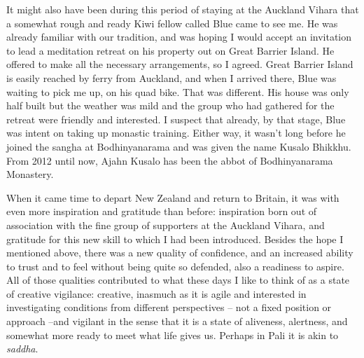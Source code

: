 It might also have been during this period of staying at the Auckland
Vihara that a somewhat rough and ready Kiwi fellow called Blue came to
see me. He was already familiar with our tradition, and was hoping I
would accept an invitation to lead a meditation retreat on his property
out on Great Barrier Island. He offered to make all the necessary
arrangements, so I agreed. Great Barrier Island is easily reached by
ferry from Auckland, and when I arrived there, Blue was waiting to pick
me up, on his quad bike. That was different. His house was only half
built but the weather was mild and the group who had gathered for the
retreat were friendly and interested. I suspect that already, by that
stage, Blue was intent on taking up monastic training. Either way, it
wasn't long before he joined the sangha at Bodhinyanarama and was given
the name Kusalo Bhikkhu. From 2012 until now, Ajahn Kusalo has been the
abbot of Bodhinyanarama Monastery.

When it came time to depart New Zealand and return to Britain, it was
with even more inspiration and gratitude than before: inspiration born
out of association with the fine group of supporters at the Auckland
Vihara, and gratitude for this new skill to which I had been introduced.
Besides the hope I mentioned above, there was a new quality of
confidence, and an increased ability to trust and to feel without being
quite so defended, also a readiness to aspire. All of those qualities
contributed to what these days I like to think of as a state of creative
vigilance: creative, inasmuch as it is agile and interested in
investigating conditions from different perspectives -- not a fixed
position or approach --and vigilant in the sense that it is a state of
aliveness, alertness, and somewhat more ready to meet what life gives
us. Perhaps in Pali it is akin to \emph{saddha}.

